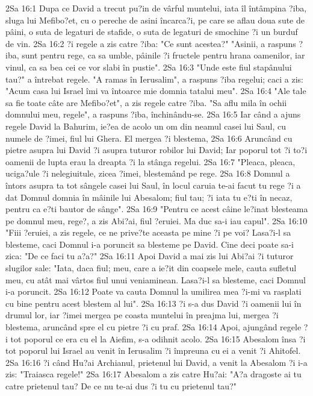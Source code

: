 2Sa 16:1  Dupa ce David a trecut pu?in de vârful muntelui, iata îl întâmpina ?iba, sluga lui Mefibo?et, cu o pereche de asini încarca?i, pe care se aflau doua sute de pâini, o suta de legaturi de stafide, o suta de legaturi de smochine ?i un burduf de vin.
2Sa 16:2  ?i regele a zis catre ?iba: "Ce sunt acestea?" "Asinii, a raspuns ?iba, sunt pentru rege, ca sa umble, pâinile ?i fructele pentru hrana oamenilor, iar vinul, ca sa bea cei ce vor slabi în pustie".
2Sa 16:3  "Unde este fiul stapânului tau?" a întrebat regele. "A ramas în Ierusalim", a raspuns ?iba regelui; caci a zis: "Acum casa lui Israel îmi va întoarce mie domnia tatalui meu".
2Sa 16:4  "Ale tale sa fie toate câte are Mefibo?et", a zis regele catre ?iba. "Sa aflu mila în ochii domnului meu, regele", a raspuns ?iba, închinându-se.
2Sa 16:5  Iar când a ajuns regele David la Bahurim, ie?ea de acolo un om din neamul casei lui Saul, cu numele de ?imei, fiul lui Ghera. El mergea ?i blestema,
2Sa 16:6  Aruncând cu pietre asupra lui David ?i asupra tuturor robilor lui David; Iar poporul tot ?i to?i oamenii de lupta erau la dreapta ?i la stânga regelui.
2Sa 16:7  "Pleaca, pleaca, uciga?ule ?i nelegiuitule, zicea ?imei, blestemând pe rege.
2Sa 16:8  Domnul a întors asupra ta tot sângele casei lui Saul, în locul caruia te-ai facut tu rege ?i a dat Domnul domnia în mâinile lui Abesalom; fiul tau; ?i iata tu e?ti în necaz, pentru ca e?ti bautor de sânge".
2Sa 16:9  "Pentru ce acest câine le?inat blesteama pe domnul meu, rege?, a zis Abi?ai, fiul ?eruiei. Ma duc sa-i iau capul".
2Sa 16:10  "Fiii ?eruiei, a zis regele, ce ne prive?te aceasta pe mine ?i pe voi? Lasa?i-l sa blesteme, caci Domnul i-a poruncit sa blesteme pe David. Cine deci poate sa-i zica: "De ce faci tu a?a?"
2Sa 16:11  Apoi David a mai zis lui Abi?ai ?i tuturor slugilor sale: "Iata, daca fiul; meu, care a ie?it din coapsele mele, cauta sufletul meu, cu atât mai vârtos fiul unui veniaminean. Lasa?i-l sa blesteme, caci Domnul i-a poruncit.
2Sa 16:12  Poate va cauta Domnul la umilirea mea ?i-mi va rasplati cu bine pentru acest blestem al lui".
2Sa 16:13  ?i s-a dus David ?i oamenii lui în drumul lor, iar ?imei mergea pe coasta muntelui în preajma lui, mergea ?i blestema, aruncând spre el cu pietre ?i cu praf.
2Sa 16:14  Apoi, ajungând regele ?i tot poporul ce era cu el la Aiefim, s-a odihnit acolo.
2Sa 16:15  Abesalom însa ?i tot poporul lui Israel au venit în Ierusalim ?i împreuna cu ei a venit ?i Ahitofel.
2Sa 16:16  ?i când Hu?ai Archianul, prietenul lui David, a venit la Abesalom ?i i-a zis: "Traiasca regele!"
2Sa 16:17  Abesalom a zis catre Hu?ai: "A?a dragoste ai tu catre prietenul tau? De ce nu te-ai dus ?i tu cu prietenul tau?"
